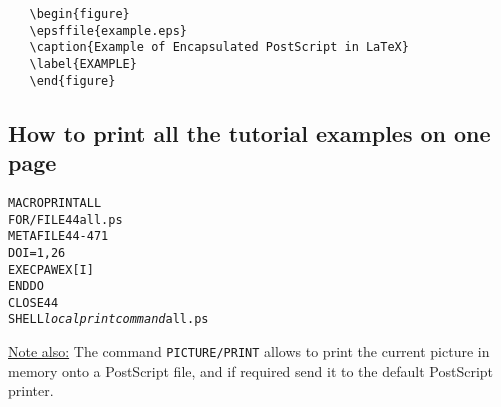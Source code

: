 \begin{verbatim}
   \begin{figure}
   \epsffile{example.eps}
   \caption{Example of Encapsulated PostScript in LaTeX}
   \label{EXAMPLE}
   \end{figure}
\end{verbatim}
\clearpage
\subsection*{How to print all the tutorial examples on one page}
\begin{alltt}
      MACRO PRINTALL
      FOR/FILE 44 all.ps
      METAFILE 44 -471
      DO I=1,26
         EXEC PAWEX[I]
      ENDDO
      CLOSE 44
      SHELL {\it local print command} all.ps
\end{alltt} 

\underline{Note also:}
The command {\tt PICTURE/PRINT} allows to print the
current picture in memory onto a PostScript file, and if required send it
to the default PostScript printer.
